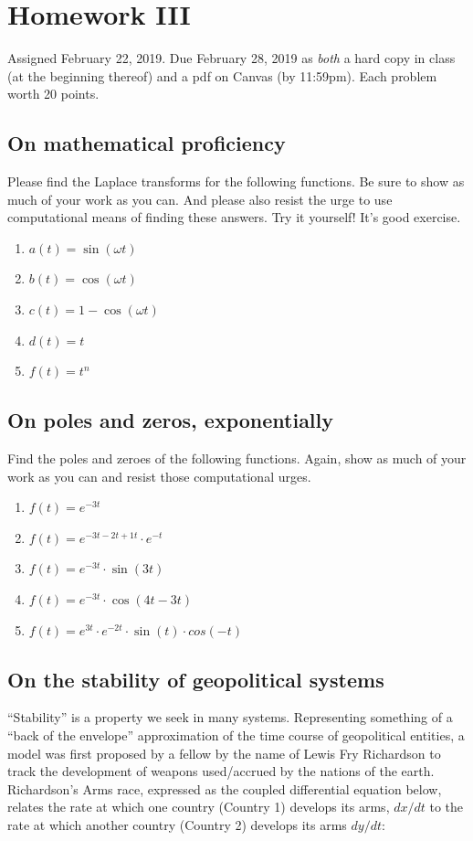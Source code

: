 \documentclass[11pt]{book}
\begin{document}
\chapter*{Homework III}
Assigned February 22, 2019. Due February 28, 2019 as \textit{both} a hard copy in class (at the beginning thereof) and a pdf on Canvas (by 11:59pm). Each problem worth 20 points.
\setcounter{chapter}{3}
\setcounter{section}{0}


\section{On mathematical proficiency}
Please find the Laplace transforms for the following functions. Be sure to show as much of your work as you can. And please also resist the urge to use computational means of finding these answers. Try it yourself! It's good exercise.

\begin{enumerate}
	\item $a(t) = \sin(\omega t)$
	\item $b(t) = \cos(\omega t)$
	\item $c(t) = 1 - \cos(\omega t)$
	\item $d(t) = t$
	\item $f(t) = t^n$
\end{enumerate}

\newpage

\section{On poles and zeros, exponentially}

Find the poles and zeroes of the following functions. Again, show as much of your work as you can and resist those computational urges.

\begin{enumerate}
	\item $f(t) = e^{-3t}$
	\item $f(t) = e^{-3t - 2t + 1t}\cdot e^{-t}$
	\item $f(t) = e^{-3t}\cdot \sin(3t)$
	\item $f(t) = e^{-3t}\cdot \cos(4t - 3t)$
	\item $f(t) = e^{3t}\cdot e^{-2t} \cdot \sin(t)\cdot cos (-t)$
\end{enumerate}

\section{On the stability of geopolitical systems}
``Stability'' is a property we seek in many systems. Representing something of a ``back of the envelope'' approximation of the time course of geopolitical entities, a model was first proposed by a fellow by the name of Lewis Fry Richardson to track the development of weapons used/accrued by the nations of the earth. Richardson's Arms race, expressed as the coupled differential equation below, relates the rate at which one country (Country 1) develops its arms, $dx/dt$ to the rate at which another country (Country 2) develops its arms $dy/dt$:
\end{document}
